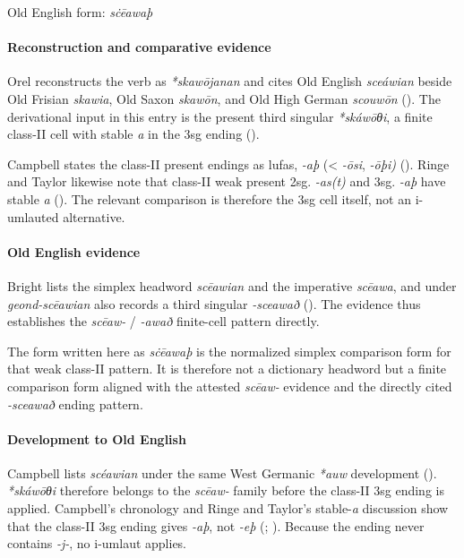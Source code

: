 \documentclass[
  british,
  a4paper,
]{article}
\begin{document}
Old English form: \emph{sċēawaþ}

\paragraph{Reconstruction and comparative
evidence}\label{reconstruction-and-comparative-evidence-66}

Orel reconstructs the verb as \emph{*skawōjanan} and cites Old English
\emph{sceáwian} beside Old Frisian \emph{skawia}, Old Saxon
\emph{skawōn}, and Old High German \emph{scouwōn}
(). The derivational input in
this entry is the present third singular \emph{*skáwōθi}, a finite
class-II cell with stable \emph{a} in the 3sg ending
().

Campbell states the class-II present endings as lufas, \emph{-aþ}
(\textless{} \emph{-ōsi}, \emph{-ōþi)}
(). Ringe and
Taylor likewise note that class-II weak present 2sg. \emph{-as(t)} and
3sg. \emph{-aþ} have stable \emph{a}
(). The
relevant comparison is therefore the 3sg cell itself, not an i-umlauted
alternative.

\paragraph{Old English evidence}\label{old-english-evidence-66}

Bright lists the simplex headword \emph{scēawian} and the imperative
\emph{scēawa}, and under \emph{geond-scēawian} also records a third
singular \emph{-sceawað} (). The evidence thus establishes the \emph{scēaw-} /
\emph{-awað} finite-cell pattern directly.

The form written here as \emph{sċēawaþ} is the normalized simplex
comparison form for that weak class-II pattern. It is therefore not a
dictionary headword but a finite comparison form aligned with the
attested \emph{scēaw-} evidence and the directly cited \emph{-sceawað}
ending pattern.

\paragraph{Development to Old
English}\label{development-to-old-english-66}

Campbell lists \emph{scéawian} under the same West Germanic \emph{*auw}
development ().
\emph{*skáwōθi} therefore belongs to the \emph{scēaw-} family before the
class-II 3sg ending is applied. Campbell's chronology and Ringe and
Taylor's stable-\emph{a} discussion show that the class-II 3sg ending
gives \emph{-aþ}, not \emph{-eþ} (; ). Because the ending never contains \emph{-j-}, no i-umlaut
applies.
\end{document}
